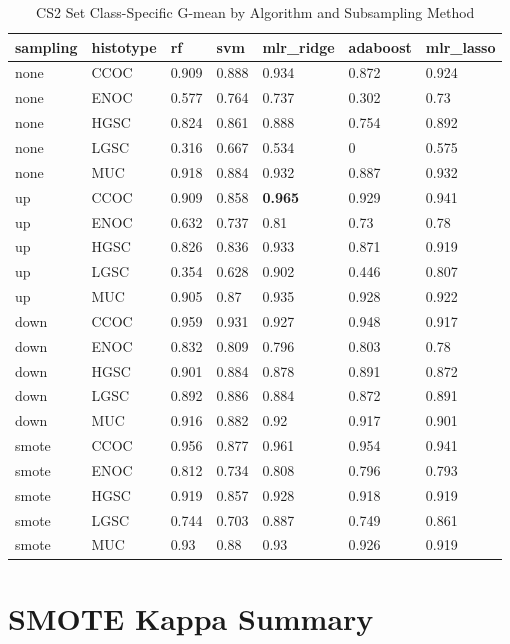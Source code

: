 \documentclass[
]{report}
\begin{document}
\begin{table}

\caption{\label{tab:cs2-gmean-class-table}CS2 Set Class-Specific G-mean by Algorithm and Subsampling Method}
\centering
\begin{tabular}[t]{l|l|l|l|l|l|l}
\hline
sampling & histotype & rf & svm & mlr\_ridge & adaboost & mlr\_lasso\\
\hline
none & CCOC & 0.909 & 0.888 & 0.934 & 0.872 & 0.924\\
\hline
none & ENOC & 0.577 & 0.764 & 0.737 & 0.302 & 0.73\\
\hline
none & HGSC & 0.824 & 0.861 & 0.888 & 0.754 & 0.892\\
\hline
none & LGSC & 0.316 & 0.667 & 0.534 & 0 & 0.575\\
\hline
none & MUC & 0.918 & 0.884 & 0.932 & 0.887 & 0.932\\
\hline
up & CCOC & 0.909 & 0.858 & \textbf{0.965} & 0.929 & 0.941\\
\hline
up & ENOC & 0.632 & 0.737 & 0.81 & 0.73 & 0.78\\
\hline
up & HGSC & 0.826 & 0.836 & 0.933 & 0.871 & 0.919\\
\hline
up & LGSC & 0.354 & 0.628 & 0.902 & 0.446 & 0.807\\
\hline
up & MUC & 0.905 & 0.87 & 0.935 & 0.928 & 0.922\\
\hline
down & CCOC & 0.959 & 0.931 & 0.927 & 0.948 & 0.917\\
\hline
down & ENOC & 0.832 & 0.809 & 0.796 & 0.803 & 0.78\\
\hline
down & HGSC & 0.901 & 0.884 & 0.878 & 0.891 & 0.872\\
\hline
down & LGSC & 0.892 & 0.886 & 0.884 & 0.872 & 0.891\\
\hline
down & MUC & 0.916 & 0.882 & 0.92 & 0.917 & 0.901\\
\hline
smote & CCOC & 0.956 & 0.877 & 0.961 & 0.954 & 0.941\\
\hline
smote & ENOC & 0.812 & 0.734 & 0.808 & 0.796 & 0.793\\
\hline
smote & HGSC & 0.919 & 0.857 & 0.928 & 0.918 & 0.919\\
\hline
smote & LGSC & 0.744 & 0.703 & 0.887 & 0.749 & 0.861\\
\hline
smote & MUC & 0.93 & 0.88 & 0.93 & 0.926 & 0.919\\
\hline
\end{tabular}
\end{table}

\hypertarget{smote-kappa-summary}{%
\section{SMOTE Kappa Summary}\label{smote-kappa-summary}}
\end{document}
